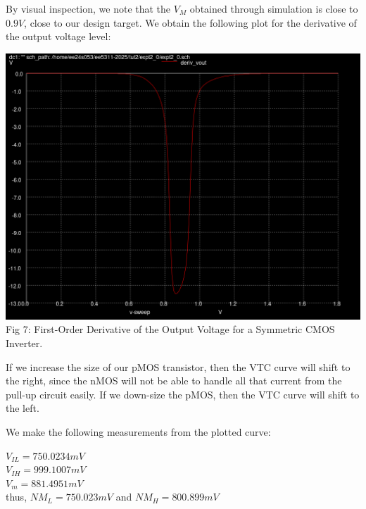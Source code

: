 \documentclass[12pt,a4paper]{article}
\begin{document}
\noindent By visual inspection, we note that the $V_M$ obtained through simulation is close to $0.9V$, close to our design target. We obtain the following plot for the derivative of the output voltage level:

\begin{center}
\includegraphics[scale=0.35]{tut2/reports/media/expt2_0_deriv_vout.png} \\ Fig 7: First-Order Derivative of the Output Voltage for a Symmetric CMOS Inverter.
\end{center}

\noindent If we increase the size of our pMOS transistor, then the VTC curve will shift to the right, since the nMOS will not be able to handle all that current from the pull-up circuit easily. If we down-size the pMOS, then the VTC curve will shift to the left.

\noindent We make the following measurements from the plotted curve:

\doublespacing
\begin{center}
    $V_{IL} = 750.0234 mV$ \\
    $V_{IH} = 999.1007 mV$ \\
    $V_m = 881.4951 mV$ \\
    thus, $NM_L = 750.023 mV$ and $NM_H = 800.899 mV$
\end{center}
\singlespacing
\end{document}
